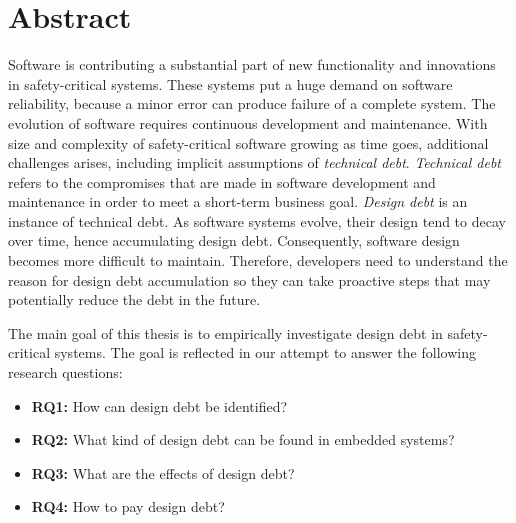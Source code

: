 


\section*{\Huge Abstract}
Software is contributing a substantial part of new functionality and innovations in safety-critical systems. These systems put a huge demand on software reliability, because a minor error can produce failure of a complete system. The evolution of software requires continuous development and maintenance. With size and complexity of safety-critical software growing as time goes, additional challenges arises, including implicit assumptions of \textit{technical debt}. \textit{Technical debt} refers to the compromises that are made in software development and maintenance in order to meet a short-term business goal. \textit{Design debt} is an instance of technical debt. As software systems evolve, their design tend to decay over time, hence accumulating design debt. Consequently, software design becomes more difficult to maintain. Therefore, developers need to understand the reason for design debt accumulation so they can take proactive steps that may potentially reduce the debt in the future.

The main goal of this thesis is to empirically investigate design debt in safety-critical systems. The goal is reflected in our attempt to answer the following research questions:
\begin{itemize}
\setlength\itemsep{-1em}
\item \textbf{RQ1:} How can design debt be identified?
\item \textbf{RQ2:} What kind of design debt can be found in embedded systems?
\item \textbf{RQ3:} What are the effects of design debt?
\item \textbf{RQ4:} How to pay design debt? 
\end{itemize}

